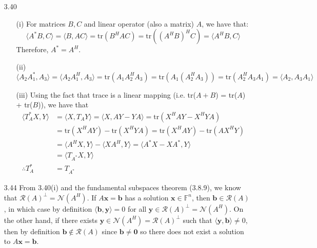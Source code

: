 \documentclass[letterpaper,12pt]{article}
\theoremstyle{definition}
\begin{document}
\begin{enumerate}
        \item[3.40]
          \begin{enumerate}
            \item[(i)]
              For matrices $B, C$ and linear operator (also a matrix) $A$, we have that:
              \begin{equation*}
                \langle A^*B, C \rangle = \langle B, AC \rangle = \text{tr}(B^HAC) = \text{tr}((A^HB)^HC) = \langle A^HB, C \rangle
              \end{equation*}
              Therefore, $A^* = A^H$.
            \item[(ii)]
            \begin{equation*}
              \langle A_2A_1^*, A_3 \rangle = \langle A_2A_1^H, A_3 \rangle = \text{tr}(A_1A_2^HA_3) = \text{tr}(A_1(A_2^HA_3)) = \text{tr}(A_2^HA_3A_1) = \langle A_2, A_3A_1 \rangle
            \end{equation*}
            \item[(iii)]
            Using the fact that trace is a linear mapping (i.e. tr($A+B$) = tr($A$) + tr($B$)), we have that
              \begin{align*}
                \langle T_A^* X, Y \rangle &= \langle X, T_A Y \rangle = \langle X, AY - YA \rangle = \text{tr}(X^HAY - X^HYA) \\
                &= \text{tr}(X^HAY) - \text{tr}(X^HYA) = \text{tr}(X^HAY) - \text{tr}(AX^HY) \\
                &= \langle A^HX, Y \rangle - \langle XA^H, Y \rangle = \langle A^*X - XA^*, Y \rangle \\
                &= \langle T_{A^*}X, Y \rangle \\
                \therefore T_A^* &= T_{A^*}
              \end{align*}
          \end{enumerate}

        \item[3.44]
        From 3.40(i) and the fundamental subspaces theorem (3.8.9), we know that $\mathscr{R}(A)^{\perp} = \mathscr{N}(A^H)$. If $A\mathbf{x} = \mathbf{b}$ has a solution $\mathbf{x} \in \mathbb{F}^n$, then $\mathbf{b} \in \mathscr{R}(A)$, in which case by definition $\langle \mathbf{b}, \mathbf{y} \rangle = 0$ for all $\mathbf{y} \in \mathscr{R}(A)^{\perp} = \mathscr{N}(A^H)$. On the other hand, if there exists $\mathbf{y} \in \mathscr{N}(A^H) = \mathscr{R}(A)^{\perp}$ such that $\langle \mathbf{y}, \mathbf{b} \rangle \neq 0$, then by definition $\mathbf{b} \notin \mathscr{R}(A)$ since $\mathbf{b} \neq \mathbf{0}$ so there does not exist a solution to $A\mathbf{x} = \mathbf{b}$.


\end{enumerate}
\end{document}

